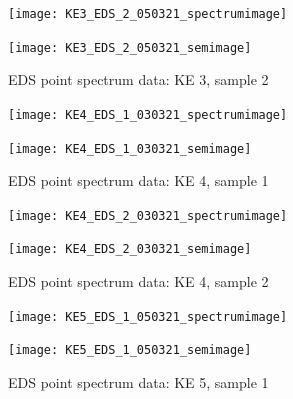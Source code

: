 \begin{figure}[H]
\centering
\begin{minipage}{.45\textwidth}
  \centering
  \texttt{[image: KE3\_EDS\_2\_050321\_spectrumimage]}
\end{minipage}
\begin{minipage}{.45\textwidth}
  \centering
  \texttt{[image: KE3\_EDS\_2\_050321\_semimage]}
\end{minipage}
\caption[EDS point spectrum data: KE 3, sample 2]{EDS point spectrum data: KE 3, sample 2}
\label{fig:ke3_point_eds_2}
\end{figure}




\begin{figure}[H]
\centering
\begin{minipage}{.45\textwidth}
  \centering
  \texttt{[image: KE4\_EDS\_1\_030321\_spectrumimage]}
\end{minipage}
\begin{minipage}{.45\textwidth}
  \centering
  \texttt{[image: KE4\_EDS\_1\_030321\_semimage]}
\end{minipage}
\caption[EDS point spectrum data: KE 4, sample 1]{EDS point spectrum data: KE 4, sample 1}
\label{fig:ke4_point_eds_1}
\end{figure}

\begin{figure}[H]
\centering
\begin{minipage}{.45\textwidth}
  \centering
  \texttt{[image: KE4\_EDS\_2\_030321\_spectrumimage]}
\end{minipage}
\begin{minipage}{.45\textwidth}
  \centering
  \texttt{[image: KE4\_EDS\_2\_030321\_semimage]}
\end{minipage}
\caption[EDS point spectrum data: KE 4, sample 2]{EDS point spectrum data: KE 4, sample 2}
\label{fig:ke4_point_eds_2}
\end{figure}




\begin{figure}[H]
\centering
\begin{minipage}{.45\textwidth}
  \centering
  \texttt{[image: KE5\_EDS\_1\_050321\_spectrumimage]}
\end{minipage}
\begin{minipage}{.45\textwidth}
  \centering
  \texttt{[image: KE5\_EDS\_1\_050321\_semimage]}
\end{minipage}
\caption[EDS point spectrum data: KE 5, sample 1]{EDS point spectrum data: KE 5, sample 1}
\label{fig:ke5_point_eds_1}
\end{figure}

